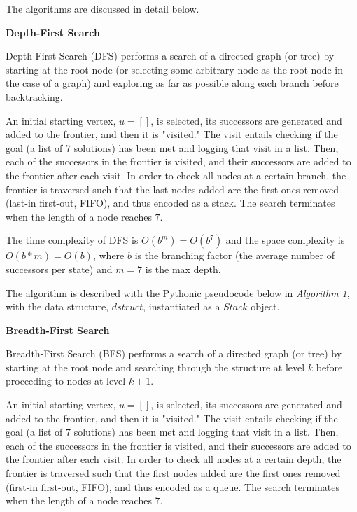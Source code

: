 \documentclass[11pt]{article}
\begin{document}
\newpage
The algorithms are discussed in detail below.

\bigskip

\textbf{Depth-First Search}

Depth-First Search (DFS) performs a search of a directed graph (or tree) by starting at the root node (or selecting some arbitrary node as the root node in the case of a graph) and exploring as far as possible along each branch before backtracking.\cite{dfs_csdict}

An initial starting vertex, $u = []$, is selected, its successors are generated and added to the frontier, and then it is "visited." The visit entails checking if the goal (a list of 7 solutions) has been met and logging that visit in a list. Then, each of the successors in the frontier is visited, and their successors are added to the frontier after each visit. In order to check all nodes at a certain branch, the frontier is traversed such that the last nodes added are the first ones removed (last-in first-out, FIFO), and thus encoded as a stack. The search terminates when the length of a node reaches $7$.

The time complexity of DFS is $O(b^m) = O(b^7)$ and the space complexity is $O(b*m) = O(b)$, where $b$ is the branching factor (the average number of successors per state) and $m=7$ is the max depth.

The algorithm is described with the Pythonic pseudocode below in \emph{Algorithm 1}, with the data structure, $dstruct$, instantiated as a $Stack$ object. 

\bigskip

\textbf{Breadth-First Search}

Breadth-First Search (BFS) performs a search of a directed graph (or tree) by starting at the root node and searching through the structure at level $k$ before proceeding to nodes at level $k+1$.\cite{bfs_csdict}

An initial starting vertex, $u = []$, is selected, its successors are generated and added to the frontier, and then it is "visited." The visit entails checking if the goal (a list of 7 solutions) has been met and logging that visit in a list. Then, each of the successors in the frontier is visited, and their successors are added to the frontier after each visit. In order to check all nodes at a certain depth, the frontier is traversed such that the first nodes added are the first ones removed (first-in first-out, FIFO), and thus encoded as a queue. The search terminates when the length of a node reaches $7$.
\end{document}
